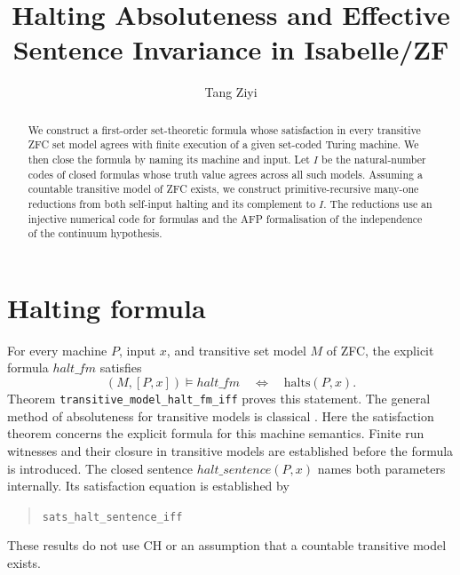 \documentclass[11pt,a4paper]{article}
\newcommand{\theoremname}[1]{{\urlstyle{tt}\nolinkurl{#1}}}
\begin{document}

\title{Halting Absoluteness and Effective Sentence Invariance in Isabelle/ZF}
\author{Tang Ziyi}
\maketitle

\begin{abstract}
We construct a first-order set-theoretic formula whose satisfaction in every
transitive ZFC set model agrees with finite execution of a given set-coded
Turing machine. We then close the formula by naming its machine and input.
Let $I$ be the natural-number codes of closed formulas whose truth value
agrees across all such models. Assuming a countable transitive model of
ZFC exists, we construct primitive-recursive many-one reductions from both
self-input halting and its complement to $I$. The reductions use an
injective numerical code for formulas and the AFP formalisation of the
independence of the continuum hypothesis.
\end{abstract}

\tableofcontents
\clearpage
{}

\section{Halting formula}
For every machine $P$, input $x$, and transitive set model $M$ of ZFC, the
explicit formula $\mathit{halt\_fm}$ satisfies
\[
  (M,[P,x])\models\mathit{halt\_fm}
  \quad\Longleftrightarrow\quad
  \mathrm{halts}(P,x).
\]
Theorem \theoremname{transitive_model_halt_fm_iff} proves this statement.
The general method of absoluteness for transitive models is classical
\cite[Chapter~12]{jech}. Here the satisfaction theorem concerns the explicit
formula for this machine semantics. Finite run witnesses and their closure
in transitive models are established before the formula is introduced. The
closed sentence $\mathit{halt\_sentence}(P,x)$ names both parameters
internally. Its satisfaction equation is established by
\begin{quote}
\small\theoremname{sats_halt_sentence_iff}
\end{quote}
These results do not use CH or an assumption that a countable transitive
model exists.
\end{document}
